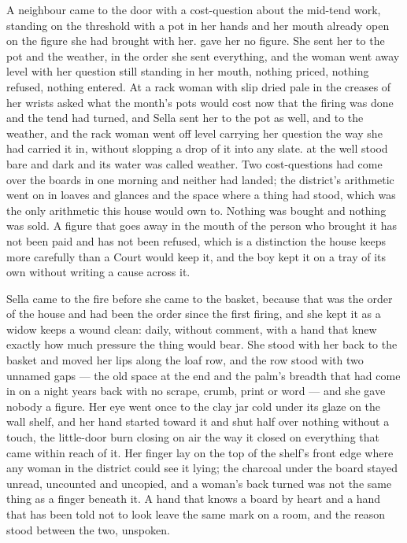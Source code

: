 A neighbour came to the door with a cost-question about the mid-tend work, standing on the threshold with a pot in her hands and her mouth already open on the figure she had brought with her.  gave her no figure. She sent her to the pot and the weather, in the order she sent everything, and the woman went away level with her question still standing in her mouth, nothing priced, nothing refused, nothing entered. At  a rack woman with slip dried pale in the creases of her wrists asked what the month's pots would cost now that the firing was done and the tend had turned, and Sella sent her to the pot as well, and to the weather, and the rack woman went off level carrying her question the way she had carried it in, without slopping a drop of it into any slate.  at the well stood bare and dark and its water was called weather. Two cost-questions had come over the boards in one morning and neither had landed; the district's arithmetic went on in loaves and glances and the space where a thing had stood, which was the only arithmetic this house would own to. Nothing was bought and nothing was sold. A figure that goes away in the mouth of the person who brought it has not been paid and has not been refused, which is a distinction the house keeps more carefully than a Court would keep it, and the boy kept it on a tray of its own without writing a cause across it.

\scenebreak

Sella came to the fire before she came to the basket, because that was the order of the house and had been the order since the first firing, and she kept it as a widow keeps a wound clean: daily, without comment, with a hand that knew exactly how much pressure the thing would bear. She stood with her back to the basket and moved her lips along the loaf row, and the row stood with two unnamed gaps --- the old space at the end and the palm's breadth that had come in on a night years back with no scrape, crumb, print or word --- and she gave nobody a figure. Her eye went once to the clay jar cold under its glaze on the wall shelf, and her hand started toward it and shut half over nothing without a touch, the little-door burn closing on air the way it closed on everything that came within reach of it. Her finger lay on the top of the shelf's front edge where any woman in the district could see it lying; the charcoal under the board stayed unread, uncounted and uncopied, and a woman's back turned was not the same thing as a finger beneath it. A hand that knows a board by heart and a hand that has been told not to look leave the same mark on a room, and the reason stood between the two, unspoken.


